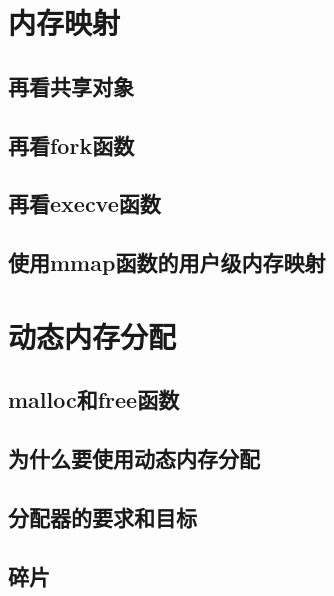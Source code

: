 \pending

\section{内存映射}

\pending

\subsection{再看共享对象}

\pending

\subsection{再看fork函数}

\pending

\subsection{再看execve函数}

\pending

\subsection{使用mmap函数的用户级内存映射}

\pending

\section{动态内存分配}

\pending

\subsection{malloc和free函数}

\pending

\subsection{为什么要使用动态内存分配}

\pending

\subsection{分配器的要求和目标}

\pending

\subsection{碎片}

